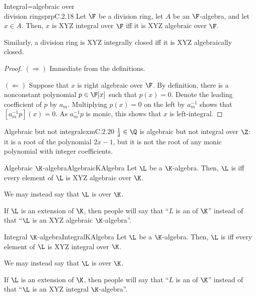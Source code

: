 \begin{mpr}{Integral=algebraic over \\ division rings}{prpC.2.18}
	Let $\F$ be a division ring, let $A$ be an $\F$-algebra, and let $x\in A$.  Then, $x$ is XYZ integral over $\F$ iff it is XYZ algebraic over $\F$.
	\begin{rmk}
		Similarly, a division ring is XYZ integrally closed iff it is XYZ algebraically closed.
	\end{rmk}
	\begin{proof}
		$(\Rightarrow )$ Immediate from the definitions.
		
		\blni
		$(\Leftarrow )$ Suppose that $x$ is right algebraic over $\F$.  By definition, there is a nonconstant polynomial $p\in \F [x]$ such that $p(x)=0$.  Denote the leading coefficient of $p$ by $a_m$.  Multiplying $p(x)=0$ on the left by $a_m^{-1}$ shows that $[a_m^{-1}p](x)=0$.  As $a_m^{-1}p$ is monic, this shows that $x$ is left-integral.
	\end{proof}
\end{mpr}
\begin{exm}{Algebraic but not integral}{exmC.2.20}
	$\frac{1}{2}\in \Q$ is algebraic but not integral over $\Z$:  it is a root of the polynomial $2x-1$, but it is not the root of any monic polynomial with integer coefficients.
\end{exm}
\begin{mdf}{Algebraic $\K$-algebra}{AlgebraicKAlgebra}
	Let $\L$ be a $\K$-algebra.  Then, $\L$ is  iff every element of $\L$ is XYZ algebraic over $\K$.
	\begin{rmk}
		We may instead say that $\L$ is  over $\K$.
	\end{rmk}
	\begin{rmk}
		If $\L$ is an extension of $\K$, then people will say that ``$L$ is an  of $\K$'' instead of that ``$\L$ is an XYZ algebraic $\K$-algebra''.
	\end{rmk}
\end{mdf}
\begin{mdf}{Integral $\K$-algebra}{IntegralKAlgebra}
	Let $\L$ be a $\K$-algebra.  Then, $\L$ is  iff every element of $\L$ is XYZ integral over $\K$.
	\begin{rmk}
		We may instead say that $\L$ is  over $\K$.
	\end{rmk}
	\begin{rmk}
		If $\L$ is an extension of $\K$, then people will say that ``$L$ is an  of $\K$'' instead of that ``$\L$ is an XYZ integral $\K$-algebra''.
	\end{rmk}
\end{mdf}
